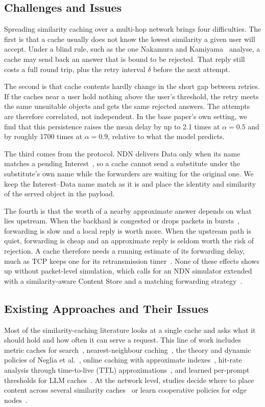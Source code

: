 \documentclass[11pt,a4paper]{article}
\begin{document}
\subsection{Challenges and Issues}
Spreading similarity caching over a multi-hop network brings four difficulties. The first is that a
cache usually does not know the lowest similarity a given user will accept. Under a blind rule, such
as the one Nakamura and Kamiyama~\cite{nakamura2024analysis} analyse, a cache may send back an answer
that is bound to be rejected. That reply still costs a full round trip, plus the retry interval
$\delta$ before the next attempt.

The second is that cache contents hardly change in the short gap between retries. If the caches near
a user hold nothing above the user's threshold, the retry meets the same unsuitable objects and gets
the same rejected answers. The attempts are therefore correlated, not independent. In the base
paper's own setting, we find that this persistence raises the mean delay by up to 2.1 times at
$\alpha=0.5$ and by roughly 1700 times at $\alpha=0.9$, relative to what the model predicts.

The third comes from the protocol. NDN delivers Data only when its name matches a pending
Interest~\cite{zhang2014ndn}, so a cache cannot send a substitute under the substitute's own name
while the forwarders are waiting for the original one. We keep the Interest--Data name match as it is
and place the identity and similarity of the served object in the payload.

The fourth is that the worth of a nearby approximate answer depends on what lies upstream. When the
backhaul is congested or drops packets in bursts~\cite{gilbert1960capacity,elliott1963estimates},
forwarding is slow and a local reply is worth more. When the upstream path is quiet, forwarding is
cheap and an approximate reply is seldom worth the risk of rejection. A cache therefore needs a
running estimate of its forwarding delay, much as TCP keeps one for its retransmission
timer~\cite{jacobson1988congestion,paxson2011rfc6298}. None of these effects shows up without
packet-level simulation, which calls for an NDN simulator extended with a similarity-aware Content
Store and a matching forwarding strategy~\cite{mastorakis2017ndnsim}.

\subsection{Existing Approaches and Their Issues}
Most of the similarity-caching literature looks at a single cache and asks what it should hold and
how often it can serve a request. This line of work includes metric caches for
search~\cite{falchi2008metric}, nearest-neighbour caching~\cite{pandey2009nn}, the theory and dynamic
policies of Neglia et al.~\cite{neglia2022similarity}, online caching with approximate
indexes~\cite{sisalem2023acai}, hit-rate analysis through time-to-live (TTL)
approximations~\cite{benmazziane2024ttl}, and learned per-prompt thresholds for LLM
caches~\cite{schroeder2025vcache}. At the network level, studies decide where to place content across
several similarity caches~\cite{garetto2021placement} or learn cooperative policies for edge
nodes~\cite{wang2025bandit}.
\end{document}
